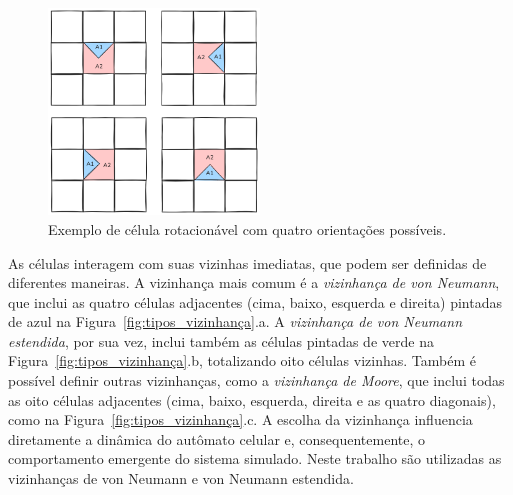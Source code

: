 \documentclass[12pt,oneside]{report}
\begin{document}
\begin{figure}[H]
    \centering
    \includegraphics[width=0.5\textwidth]{img/componente_rotaciona.png}
    \caption{\small Exemplo de célula rotacionável com quatro orientações possíveis.}
    \label{fig:celula_rotacionavel}
\end{figure}

As células interagem com suas vizinhas imediatas, que podem ser definidas de diferentes maneiras. A vizinhança mais comum é a \textit{vizinhança de von Neumann}, que inclui as quatro células adjacentes (cima, baixo, esquerda e direita) pintadas de azul na Figura~\ref{fig:tipos_vizinhança}.a. A \textit{vizinhança de von Neumann estendida}, por sua vez, inclui também as células pintadas de verde na Figura~\ref{fig:tipos_vizinhança}.b, totalizando oito células vizinhas. Também é possível definir outras vizinhanças, como a \textit{vizinhança de Moore}, que inclui todas as oito células adjacentes (cima, baixo, esquerda, direita e as quatro diagonais), como na Figura~\ref{fig:tipos_vizinhança}.c. A escolha da vizinhança influencia diretamente a dinâmica do autômato celular e, consequentemente, o comportamento emergente do sistema simulado. Neste trabalho são utilizadas as vizinhanças de von Neumann e von Neumann estendida.
\end{document}
